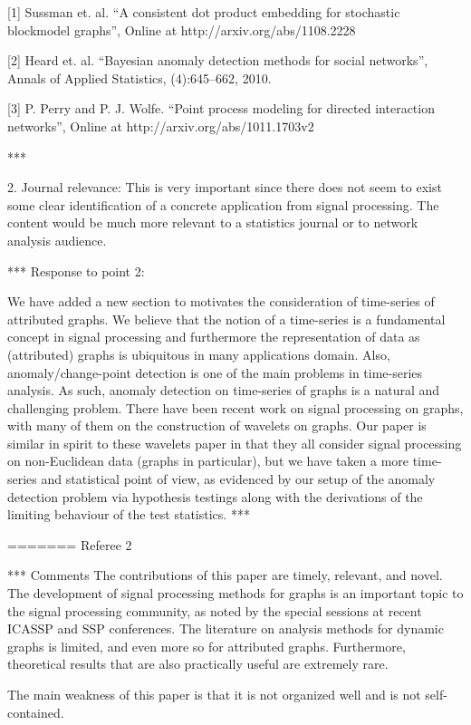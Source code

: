     [1] Sussman et. al. ``A consistent dot product embedding for
    stochastic blockmodel graphs'', Online at http://arxiv.org/abs/1108.2228

    [2] Heard et. al. ``Bayesian anomaly detection methods for social
    networks'', Annals of Applied Statistics, (4):645--662, 2010.

    [3] P. Perry and P. J. Wolfe. ``Point process modeling for directed
    interaction networks'', Online at http://arxiv.org/abs/1011.1703v2

***

2. Journal relevance: This is very important since there does not seem
to exist some clear identification of a concrete application from
signal processing. The content would be much more relevant to a
statistics journal or to network analysis audience.

*** Response to point 2:
    
We have added a new section to motivates the consideration of
time-series of attributed graphs. We believe that the notion of a
time-series is a fundamental concept in signal processing and
furthermore the representation of data as (attributed) graphs is
ubiquitous in many applications domain. Also, anomaly/change-point
detection is one of the main problems in time-series analysis. As
such, anomaly detection on time-series of graphs is a natural and
challenging problem. There have been recent work on signal processing
on graphs, with many of them on the construction of wavelets on
graphs. Our paper is similar in spirit to these wavelets paper in that
they all consider signal processing on non-Euclidean data (graphs in
particular), but we have taken a more time-series and statistical 
point of view, as evidenced by our setup of the anomaly detection
problem via hypothesis testings along with the derivations of the
limiting behaviour of the test statistics.  
***

=======
Referee 2

*** Comments
The contributions of this paper are timely, relevant, and novel. The
development of signal processing methods for graphs is an important
topic to the signal processing community, as noted by the special
sessions at recent ICASSP and SSP conferences. The literature on
analysis methods for dynamic graphs is limited, and even more so for
attributed graphs. Furthermore, theoretical results that are also
practically useful are extremely rare.

The main weakness of this paper is that it is not organized well and
is not self-contained.

